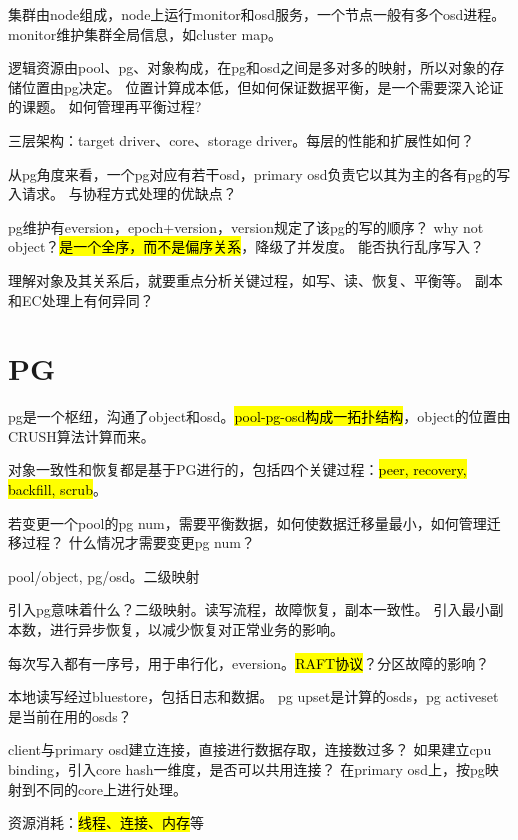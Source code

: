 集群由node组成，node上运行monitor和osd服务，一个节点一般有多个osd进程。
monitor维护集群全局信息，如cluster map。

逻辑资源由pool、pg、对象构成，在pg和osd之间是多对多的映射，所以对象的存储位置由pg决定。
位置计算成本低，但如何保证数据平衡，是一个需要深入论证的课题。
如何管理再平衡过程?

三层架构：target driver、core、storage driver。每层的性能和扩展性如何？

从pg角度来看，一个pg对应有若干osd，primary osd负责它以其为主的各有pg的写入请求。
与协程方式处理的优缺点？

pg维护有eversion，epoch+version，version规定了该pg的写的顺序？
why not object？\hl{是一个全序，而不是偏序关系}，降级了并发度。
能否执行乱序写入？

理解对象及其关系后，就要重点分析关键过程，如写、读、恢复、平衡等。
副本和EC处理上有何异同？

\section{PG}

pg是一个枢纽，沟通了object和osd。\hl{pool-pg-osd构成一拓扑结构}，object的位置由CRUSH算法计算而来。

对象一致性和恢复都是基于PG进行的，包括四个关键过程：\hl{peer, recovery, backfill, scrub}。

若变更一个pool的pg num，需要平衡数据，如何使数据迁移量最小，如何管理迁移过程？
什么情况才需要变更pg num？

pool/object, pg/osd。二级映射

引入pg意味着什么？二级映射。读写流程，故障恢复，副本一致性。
引入最小副本数，进行异步恢复，以减少恢复对正常业务的影响。

每次写入都有一序号，用于串行化，eversion。\hl{RAFT协议}？分区故障的影响？

本地读写经过bluestore，包括日志和数据。
pg upset是计算的osds，pg activeset是当前在用的osds？

client与primary osd建立连接，直接进行数据存取，连接数过多？
如果建立cpu binding，引入core hash一维度，是否可以共用连接？
在primary osd上，按pg映射到不同的core上进行处理。

资源消耗：\hl{线程、连接、内存}等

